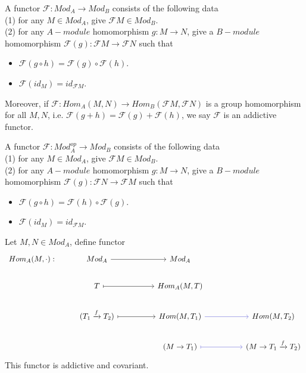 \documentclass[11pt,fleqn]{book} %
\begin{document}
\begin{CJK}{UTF8}{gkai}
\newcommand{\mcf}{\mathcal{F}}

\begin{definition}
	 A functor $\mathcal{F}:Mod_A \to Mod_B$ consists of the following data \\
	(1) for any $M\in Mod_A$, give $\mcf M \in Mod_B$. \\
	(2) for any $A-module$ homomorphism $g:M\to N$, give a $B-module$ homomorphism $\mcf (g) : \mcf M \to \mcf N$ such that 
	\begin{itemize}
		\item $\mcf(g\circ h) = \mcf(g)\circ \mcf(h)$.
		\item $\mcf(id_M) = id_{\mcf M}$.
	\end{itemize} 	
	Moreover, if $\mcf: Hom_A(M,N) \to Hom_B(\mcf M,\mcf N)$ is a group homomorphism for all $M, N$, i.e. $\mcf(g+h) = \mcf(g) + \mcf(h)$, we say $\mcf$ is an addictive functor. 
\end{definition}

\begin{definition}
	 A functor $\mathcal{F}:Mod_A^{op} \to Mod_B$ consists of the following data \\
	(1) for any $M\in Mod_A$, give $\mcf M \in Mod_B$. \\
	(2) for any $A-module$ homomorphism $g:M\to N$, give a $B-module$ homomorphism $\mcf (g) : \mcf N \to \mcf M$ such that 
	\begin{itemize}
		\item $\mcf(g\circ h) = \mcf(h)\circ \mcf(g)$.
		\item $\mcf(id_M) = id_{\mcf M}$.
	\end{itemize} 	
\end{definition}

\begin{example}
	Let $M,N \in Mod_A$, define functor 
	\[\begin{tikzcd}
		{Hom_A(M,\cdot):} & {Mod_A} && {Mod_A} \\
		& T && {Hom_A(M,T)} \\
		& {(T_1\xrightarrow{f}T_2)} && {Hom(M,T_1)} && {Hom(M,T_2)} \\
		&&& {(M\to T_1)} && {(M\to T_1 \xrightarrow{f}T_2)}
		\arrow[from=1-2, to=1-4]
		\arrow[maps to, from=2-2, to=2-4]
		\arrow[color={rgb,255:red,92;green,92;blue,214}, from=3-4, to=3-6]
		\arrow[color={rgb,255:red,92;green,92;blue,214}, maps to, from=4-4, to=4-6]
		\arrow[maps to, from=3-2, to=3-4]
	\end{tikzcd}\]
	This functor is addictive and covariant.
\end{example}


\end{CJK}
\end{document}
